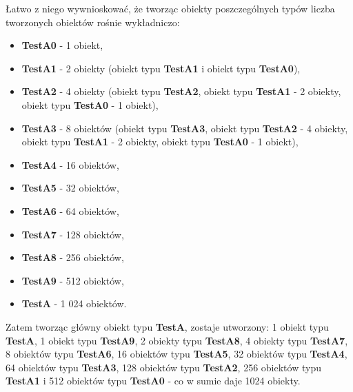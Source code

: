\documentclass[12pt]{article}
\begin{document}
Łatwo z niego wywnioskować, że tworząc obiekty poszczególnych typów liczba tworzonych obiektów rośnie wykładniczo:
\begin{itemize}
	\item \textbf{TestA0} - 1 obiekt,
	\item \textbf{TestA1} - 2 obiekty (obiekt typu \textbf{TestA1} i obiekt typu \textbf{TestA0}),
	\item \textbf{TestA2} - 4 obiekty (obiekt typu \textbf{TestA2}, obiekt typu \textbf{TestA1} - 2 obiekty, obiekt typu \textbf{TestA0} - 1 obiekt),
	\item \textbf{TestA3} - 8 obiektów (obiekt typu \textbf{TestA3}, obiekt typu \textbf{TestA2} - 4 obiekty, obiekt typu \textbf{TestA1} - 2 obiekty, obiekt typu \textbf{TestA0} - 1 obiekt),
	\item \textbf{TestA4} - 16 obiektów,
	\item \textbf{TestA5} - 32 obiektów,
	\item \textbf{TestA6} - 64 obiektów,
	\item \textbf{TestA7} - 128 obiektów,
	\item \textbf{TestA8} - 256 obiektów,
	\item \textbf{TestA9} - 512 obiektów,
	\item \textbf{TestA} - 1 024 obiektów.
\end{itemize}
Zatem tworząc główny obiekt typu \textbf{TestA}, zostaje utworzony: 1 obiekt typu \textbf{TestA}, 1 obiekt typu \textbf{TestA9}, 2 obiekty typu \textbf{TestA8}, 4 obiekty typu \textbf{TestA7}, 8 obiektów typu \textbf{TestA6}, 16 obiektów typu \textbf{TestA5}, 32 obiektów typu \textbf{TestA4}, 64 obiektów typu \textbf{TestA3}, 128 obiektów typu \textbf{TestA2}, 256 obiektów typu \textbf{TestA1} i 512 obiektów typu \textbf{TestA0} - co w sumie daje 1024 obiekty.
\end{document}
